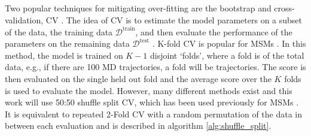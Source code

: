 Two popular techniques for mitigating over-fitting \cite{friedman2001elements} are the bootstrap \cite{efronIntroductionBootstrap1993} and cross-validation, CV \cite{arlotSurveyCrossvalidationProcedures2009}.  The idea of CV is to estimate the model parameters on a subset of the data, the training data $\mathcal{D}^{\mathrm{train}}$, and then evaluate the performance of the parameters on the remaining data $\mathcal{D}^{\mathrm{test}}$ \cite{friedman2001elements}. K-fold CV is popular for MSMs \cite{schererVariationalSelectionFeatures2019,mcgibbonVariationalCrossvalidationSlow2015}. In this method, the model is trained on $K-1$ disjoint `folds',  where a fold is  of the total data, e.g., if there are \num{100} MD trajectories, a fold will be  trajectories. The score is then evaluated on the single held out fold and the average score over the $K$ folds is used to evaluate the model. However, many different methods exist \cite{arlotSurveyCrossvalidationProcedures2009} and this work will use 50:50 shuffle split CV, which has been used previously for MSMs \cite{chenDynamicConformationalLandscape2019,husicOptimizedParameterSelection2016}. It is equivalent to repeated 2-Fold CV with a random permutation of the data in between each evaluation and is described in algorithm \ref{alg:shuffle_split}. 

